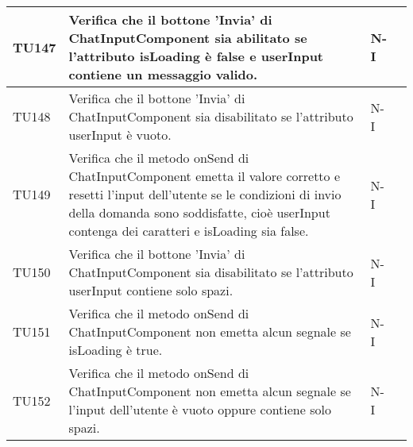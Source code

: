 \begin{table}[h!]
\begin{tabularx}{\textwidth}{|p{}|X|p{}|p{}|}
    TU147 & Verifica che il bottone 'Invia' di ChatInputComponent sia abilitato se l'attributo isLoading è false e userInput contiene un messaggio valido. &  N-I \\ \hline
    TU148 & Verifica che il bottone 'Invia' di ChatInputComponent sia disabilitato se l'attributo userInput è vuoto. &  N-I \\ \hline
    TU149 & Verifica che il metodo onSend di ChatInputComponent emetta il valore corretto e resetti l'input dell'utente se le condizioni di invio della domanda sono soddisfatte, cioè userInput contenga dei caratteri e isLoading sia false. &  N-I \\ \hline
    TU150 & Verifica che il bottone 'Invia' di ChatInputComponent sia disabilitato se l'attributo userInput contiene solo spazi. &  N-I \\ \hline
    TU151 & Verifica che il metodo onSend di ChatInputComponent non emetta alcun segnale se isLoading è true. &  N-I \\ \hline
    TU152 & Verifica che il metodo onSend di ChatInputComponent non emetta alcun segnale se l'input dell'utente è vuoto oppure contiene solo spazi. &  N-I \\ \hline

    \end{tabularx}
\end{table}

\newpage

